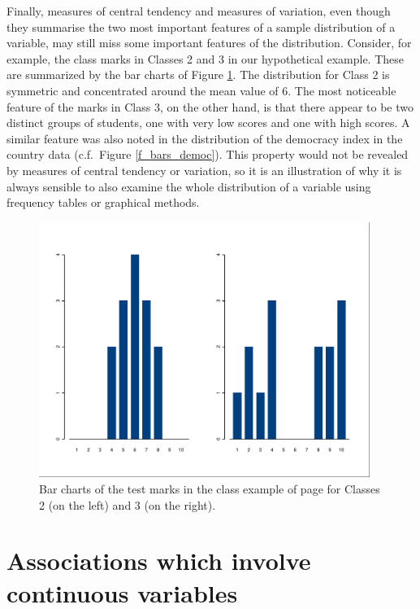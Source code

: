 Finally, measures of central tendency and measures of variation, even
though they summarise the two most important features of a sample
distribution of a variable, may still miss some important features of the
distribution. Consider, for example, the class marks in Classes 2 and 3
in our hypothetical example. These are summarized by the bar charts of
Figure \ref{f_classbars}. The distribution for Class 2 is symmetric and
concentrated around the mean value of 6. The most noticeable feature of
the marks in Class 3, on the other hand, is that there appear to be two
distinct groups of students, one with very low scores and one with high
scores. A similar feature was also noted in the distribution of the
democracy index in the country data (c.f.\ Figure \ref{f_bars_democ}).
This property would not be revealed by measures of central tendency or
variation, so it is an illustration of why it is always sensible to also
examine the whole distribution of a variable using frequency tables or
graphical methods.

\begin{figure}
\caption{Bar charts of the test marks in the class example of page
\pageref{p_classex} for Classes 2 (on the left) and 3 (on the right).}
\label{f_classbars}
\begin{center}
\includegraphics[height=8.3cm]{classbars}
\end{center}
\end{figure}

\section{Associations which involve continuous variables}
\label{s_descr1_2cont}

